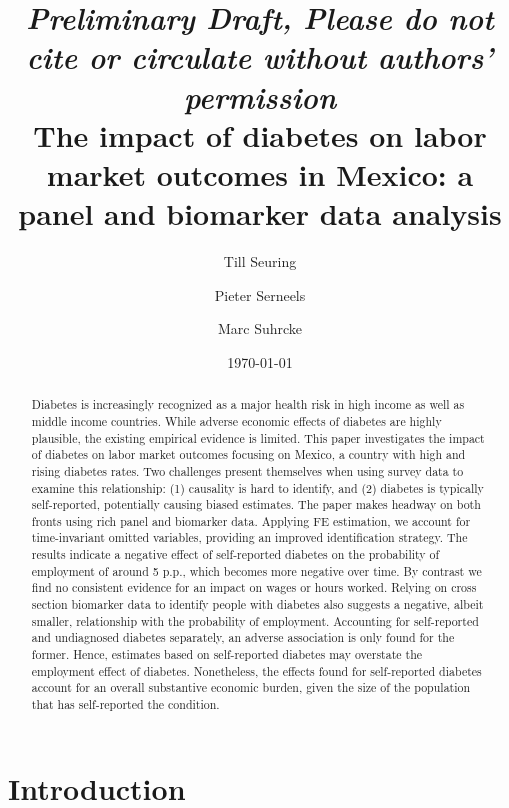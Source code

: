 \documentclass[12pt,english]{article}
\begin{document}
\title{\emph{{\normalsize Preliminary Draft, Please do not cite or circulate without authors' permission}} \\  The impact of diabetes on labor market outcomes in Mexico: a panel and biomarker data analysis}

\author[*]{Till Seuring}
\author[*]{Pieter Serneels}
\author[**]{Marc Suhrcke}

\date{\today}


\maketitle 


\begin{abstract}
Diabetes is increasingly recognized as a major health risk in high income as well as middle income countries. While adverse economic effects of diabetes are highly plausible, the existing empirical evidence is limited. This paper investigates the impact of diabetes on labor market outcomes focusing on Mexico, a country with high and rising diabetes rates. Two challenges present themselves when using survey data to examine this relationship: (1) causality is hard to identify, and (2) diabetes is typically self-reported, potentially causing biased estimates. The paper makes headway on both fronts using rich panel and biomarker data. Applying \ac{FE} estimation, we account for time-invariant omitted variables, providing an improved identification strategy. The results indicate a negative effect of self-reported diabetes on the probability of employment of around 5 \ac{p.p.}, which becomes more negative over time. By contrast we find no consistent evidence for an impact on wages or hours worked. Relying on cross section biomarker data to identify people with diabetes also suggests a negative, albeit smaller, relationship with the probability of employment. Accounting for self-reported and undiagnosed diabetes separately, an adverse association is only found for the former. Hence, estimates based on self-reported diabetes may overstate the employment effect of diabetes. Nonetheless, the effects found for self-reported diabetes account for an overall substantive economic burden, given the size of the population that has self-reported the condition.
\end{abstract}

\section{\label{sec:Introduction}Introduction }
\end{document}
